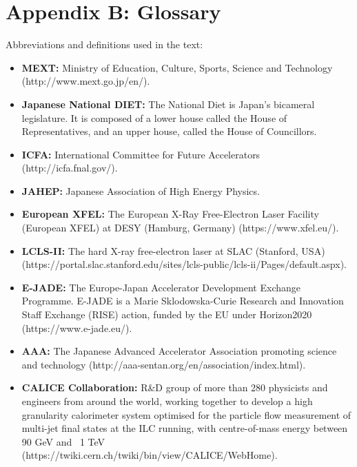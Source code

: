 \documentclass[%
 reprint,
 floatfix,
 amsmath,amssymb,
 aps,
]{revtex4-1}
\begin{document}
\section*{\label{Appendix4} \Large{Appendix B: Glossary} }
Abbreviations and definitions used in the text:
\begin{itemize}
\item
\textbf{MEXT:} Ministry of Education, Culture, Sports, Science and Technology (http://www.mext.go.jp/en/).
\item
\textbf{Japanese National DIET:} The National Diet is Japan's bicameral legislature. It is composed of a lower house called the House of Representatives, and an upper house, called the House of Councillors.
\item
\textbf{ICFA:} International Committee for Future Accelerators (http://icfa.fnal.gov/).
\item
\textbf{JAHEP:} Japanese Association of High Energy Physics.
\item
\textbf{European XFEL:} The European X-Ray Free-Electron Laser Facility (European XFEL) at DESY (Hamburg, Germany) (https://www.xfel.eu/).
\item
\textbf{LCLS-II:}  The hard X-ray free-electron laser at SLAC (Stanford, USA)(https://portal.slac.stanford.edu/sites/lcls-public/lcls-ii/Pages/default.aspx).
\item
\textbf{E-JADE:} The Europe-Japan Accelerator Development Exchange Programme. E-JADE is a Marie Sklodowska-Curie Research and Innovation Staff Exchange (RISE) action, funded by the EU under Horizon2020 (https://www.e-jade.eu/).
\item
\textbf{AAA:} The Japanese Advanced Accelerator Association promoting science and technology (http://aaa-sentan.org/en/association/index.html).
\item
\textbf{CALICE Collaboration:} R\&D group of more than 280 physicists and engineers from around the world, working together to develop a high granularity calorimeter system optimised for the particle flow measurement of multi-jet final states at the ILC running, with centre-of-mass energy between 90 GeV and ~1 TeV (https://twiki.cern.ch/twiki/bin/view/CALICE/WebHome).

\end{itemize}
\end{document}
